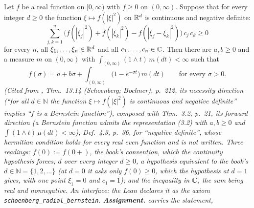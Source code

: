 \begin{theorem}
\label{thm:cited-A10}
\leanok
Let $f$ be a real function on $[0,\infty)$ with $f \ge 0$ on $(0,\infty)$. Suppose that for every
integer $d \ge 0$ the function $\xi \mapsto f(|\xi|^2)$ on $\mathbb{R}^d$ is continuous and negative
definite:
\[
  \sum_{j,k=1}^n \bigl(f(|\xi_j|^2) + f(|\xi_k|^2) - f(|\xi_j - \xi_k|^2)\bigr)\,c_j\,\overline{c_k}
  \ge 0
\]
for every $n$, all $\xi_1, \dots, \xi_n \in \mathbb{R}^d$ and all $c_1, \dots, c_n \in \mathbb{C}$. Then there
are $a, b \ge 0$ and a measure $m$ on $(0,\infty)$ with $\int_{(0,\infty)}(1 \wedge t)\,m(dt) <
\infty$ such that
\[
  f(\sigma) = a + b\sigma + \int_{(0,\infty)} \bigl(1 - e^{-\sigma t}\bigr)\,m(dt)
  \qquad \text{for every } \sigma > 0 .
\]
\statusA\quad{}\quad\emph{(Cited from , Thm.~13.14
(Schoenberg; Bochner), p.~212, its necessity direction (``for all $d \in \mathbb{N}$ the function
$\xi \mapsto f(|\xi|^2)$ is continuous and negative definite'' implies ``$f$ is a Bernstein
function''), composed with Thm.~3.2, p.~21, its forward direction (a Bernstein function admits the
representation (3.2) with $a, b \ge 0$ and $\int(1 \wedge t)\,\mu(dt) < \infty$); Def.~4.3, p.~36,
for ``negative definite'', whose hermitian condition holds for every real even function and is not
written. Three readings: $f(0) := f(0+)$, the book's convention, which the continuity hypothesis
forces; $d$ over every integer $d \ge 0$, a hypothesis equivalent to the book's
$d \in \mathbb{N} = \{1, 2, \dots\}$ (at $d = 0$ it asks only $f(0) \ge 0$, which the hypothesis
at $d = 1$ gives, with one point $\xi_1 = 0$ and $c_1 = 1$); and the inequality in
$\mathbb{C}$, the sum being real and nonnegative. An interface: the Lean declares it as the axiom
\texttt{schoenberg\_radial\_bernstein}. \textbf{Assignment.}  carries the statement,
}
\end{theorem}
